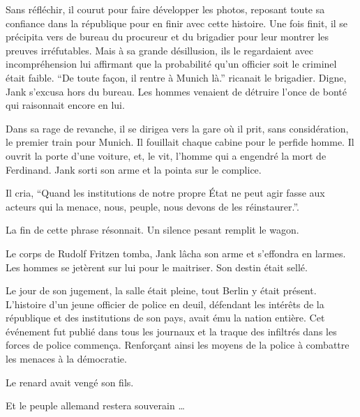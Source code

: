 Sans réfléchir, il courut pour faire développer les photos, reposant toute sa confiance dans la république pour en finir avec cette histoire.
Une fois finit, il se précipita vers de bureau du procureur et du brigadier pour leur montrer les preuves irréfutables.
Mais à sa grande désillusion, ils le regardaient avec incompréhension lui affirmant que la probabilité qu'un officier soit le criminel était faible.
\enquote{De toute façon, il rentre à Munich là.} ricanait le brigadier. 
Digne, Jank s'excusa hors du bureau. 
Les hommes venaient de détruire l'once de bonté qui raisonnait encore en lui.

Dans sa rage de revanche, il se dirigea vers la gare où il prit, sans considération, le premier train pour Munich.
Il fouillait chaque cabine pour le perfide homme.
Il ouvrit la porte d'une voiture, et, le vit, l'homme qui a engendré la mort de Ferdinand.
Jank sorti son arme et la pointa sur le complice.
\pagebreak

Il cria, \enquote{Quand les institutions de notre propre État ne peut agir fasse aux acteurs qui la menace, nous, peuple, nous devons de les réinstaurer.}.

La fin de cette phrase résonnait.
Un silence pesant remplit le wagon.

Le corps de Rudolf Fritzen tomba, Jank lâcha son arme et s'effondra en larmes.
Les hommes se jetèrent sur lui pour le maitriser.
Son destin était sellé.

Le jour de son jugement, la salle était pleine, tout Berlin y était présent.
L'histoire d'un jeune officier de police en deuil, défendant les intérêts de la république et des institutions de son pays, 
avait ému la nation entière. 
Cet événement fut publié dans tous les journaux et la traque des infiltrés dans les forces de police commença.
Renforçant ainsi les moyens de la police à combattre les menaces à la démocratie. 

Le renard avait vengé son fils.

Et le peuple allemand restera souverain \dots